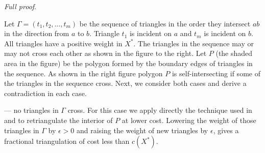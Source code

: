 \documentclass[final]{siamltex}
\newcommand{\cost}{c}
\newcommand{\polygon}{P}
\newcommand{\fracTriang}{X}
\newenvironment{fullproof}{\par{\it Full proof}. \ignorespaces}{\endproof}
\begin{document}
\begin{fullproof}
Let $\Gamma = (t_1,t_2,\ldots,t_m)$ be the sequence of triangles in the order they intersect 
$a b$ in the direction from $a$ to $b$. Triangle $t_1$ is incident on $a$ and $t_m$ is incident on $b$. 
All triangles have a positive weight in $\fracTriang^*$.
The triangles in the sequence may or may not cross each other as shown in the figure to the right.
Let $\polygon$ (the shaded area in the figure) be the polygon formed by the boundary edges of triangles in the sequence.
As shown in the right figure polygon $\polygon$ is self-intersecting if some of the triangles in the sequence cross.
Next, we consider both cases and derive a contradiction in each case.
\end{window}




 --- no triangles in $\Gamma$ cross.  For this case we apply directly the technique used in 
\cite{keil1994computing} and \cite{cheng1996approaching} to retriangulate the interior of $\polygon$ at lower cost.
Lowering the weight of those triangles in $\Gamma$ by $\epsilon>0$
and raising the weight of new triangles by $\epsilon$,
gives a fractional triangulation of cost less than $\cost(\fracTriang^*)$.




\end{fullproof}
\end{document}
